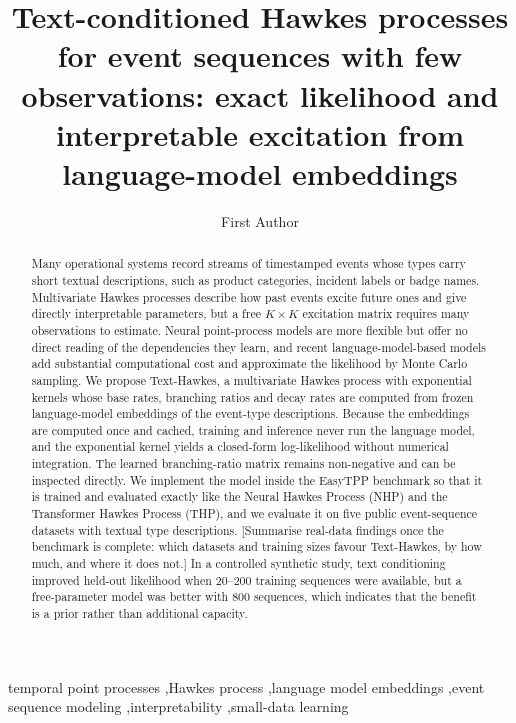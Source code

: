 \documentclass[preprint,12pt,authoryear]{elsarticle}
\newcommand{\todo}[1]{{\color{red}[#1]}}
\begin{document}
\begin{frontmatter}

\title{Text-conditioned Hawkes processes for event sequences with few observations: exact likelihood and interpretable excitation from language-model embeddings}

\author[a]{First Author}

\begin{abstract}
Many operational systems record streams of timestamped events whose types carry short textual descriptions, such as product categories, incident labels or badge names. Multivariate Hawkes processes describe how past events excite future ones and give directly interpretable parameters, but a free $K\times K$ excitation matrix requires many observations to estimate. Neural point-process models are more flexible but offer no direct reading of the dependencies they learn, and recent language-model-based models add substantial computational cost and approximate the likelihood by Monte Carlo sampling. We propose Text-Hawkes, a multivariate Hawkes process with exponential kernels whose base rates, branching ratios and decay rates are computed from frozen language-model embeddings of the event-type descriptions. Because the embeddings are computed once and cached, training and inference never run the language model, and the exponential kernel yields a closed-form log-likelihood without numerical integration. The learned branching-ratio matrix remains non-negative and can be inspected directly. We implement the model inside the EasyTPP benchmark so that it is trained and evaluated exactly like the Neural Hawkes Process (NHP) and the Transformer Hawkes Process (THP), and we evaluate it on five public event-sequence datasets with textual type descriptions. \todo{Summarise real-data findings once the benchmark is complete: which datasets and training sizes favour Text-Hawkes, by how much, and where it does not.} In a controlled synthetic study, text conditioning improved held-out likelihood when 20--200 training sequences were available, but a free-parameter model was better with 800 sequences, which indicates that the benefit is a prior rather than additional capacity.
\end{abstract}

\begin{keyword}
temporal point processes \sep Hawkes process \sep language model embeddings \sep event sequence modeling \sep interpretability \sep small-data learning
\end{keyword}

\end{frontmatter}
\end{document}
